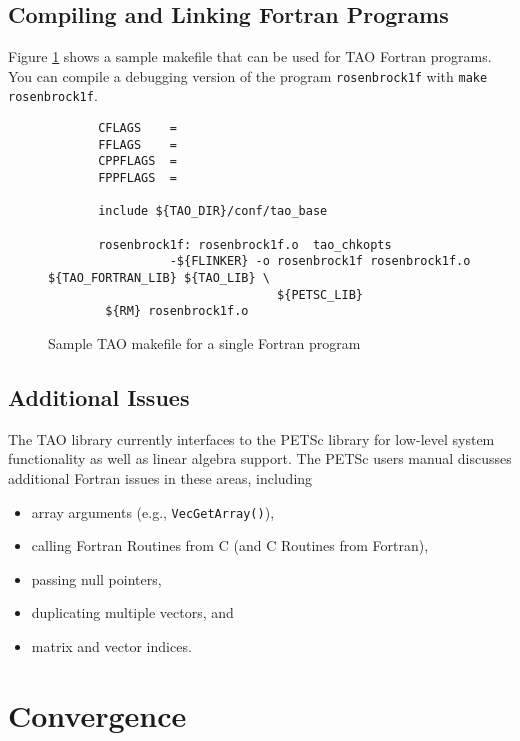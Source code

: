 \subsection{Compiling and Linking Fortran Programs}
\label{sec:fortcompile}

Figure \ref{fig:make4} shows a sample makefile that can be used for
TAO Fortran programs.  You can compile a debugging
version of the program {\tt rosenbrock1f} with 
{\tt make rosenbrock1f}.

\begin{figure}[tbh]
{\footnotesize
\begin{verbatim}   
       CFLAGS    = 
       FFLAGS    = 
       CPPFLAGS  =
       FPPFLAGS  =
       
       include ${TAO_DIR}/conf/tao_base
   
       rosenbrock1f: rosenbrock1f.o  tao_chkopts
                 -${FLINKER} -o rosenbrock1f rosenbrock1f.o ${TAO_FORTRAN_LIB} ${TAO_LIB} \
                                ${PETSC_LIB}
        ${RM} rosenbrock1f.o
\end{verbatim} %
\noindent
}
\caption{Sample TAO makefile for a single Fortran program}
\label{fig:make4}
\end{figure}


\subsection{Additional Issues}

The TAO library currently interfaces to the PETSc library for
low-level system functionality as well as linear algebra support.  The
PETSc users manual discusses additional Fortran issues in these areas,
including
\begin{itemize}
\item array arguments (e.g., {\tt VecGetArray()}),
\item calling Fortran Routines from C (and C Routines from Fortran),
\item passing null pointers,
\item duplicating multiple vectors, and
\item matrix and vector indices.
\end{itemize}




\section{Convergence}\label{sec:customize}

